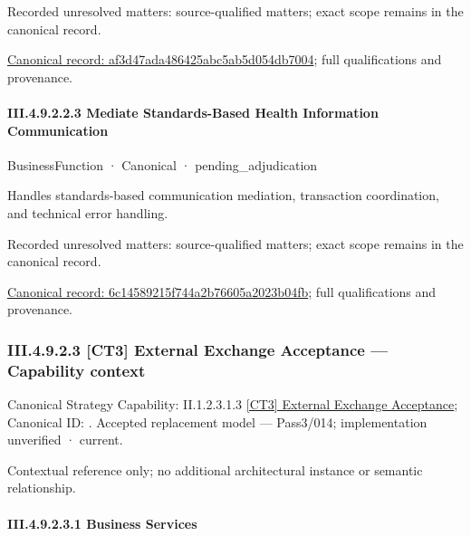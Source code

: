 {\small Recorded unresolved matters: source-qualified matters; exact scope remains in the canonical record.}\par
{\footnotesize \href{../../../../continuum/business/business-function/af3d47ada486425abc5ab5d054db7004.md}{Canonical record: af3d47ada486425abc5ab5d054db7004}; full qualifications and provenance.}\par
\paragraph*{III.4.9.2.2.3 Mediate Standards-Based Health Information Communication}
\label{navigation:III.4.9.2.2.3}

\label{element:6c14589215f744a2b76605a2023b04fb}
{\small BusinessFunction · Canonical · pending\_adjudication}\par

Handles standards-based communication mediation, transaction coordination, and technical error handling.


{\small Recorded unresolved matters: source-qualified matters; exact scope remains in the canonical record.}\par
{\footnotesize \href{../../../../continuum/business/business-function/6c14589215f744a2b76605a2023b04fb.md}{Canonical record: 6c14589215f744a2b76605a2023b04fb}; full qualifications and provenance.}\par
\subsubsection*{III.4.9.2.3 [CT3] External Exchange Acceptance — Capability context}
\label{navigation:III.4.9.2.3}

{\small Canonical Strategy Capability: II.1.2.3.1.3 \hyperref[element:ff8ab280fa034c10b846a147ab7dbfb3]{[CT3] External Exchange Acceptance}; Canonical ID: \texttt{}. Accepted replacement model — Pass3/014; implementation unverified · current.}\par
Contextual reference only; no additional architectural instance or semantic relationship.\par
\paragraph*{III.4.9.2.3.1 Business Services}
\label{navigation:III.4.9.2.3.1}

